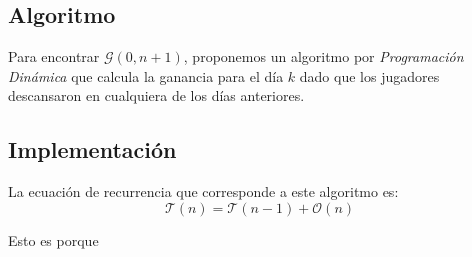 \subsection{Algoritmo}

Para encontrar $\mathcal{G} \left( 0, n + 1 \right)$, proponemos un algoritmo
por \textit{Programaci\'on Din\'amica} que calcula la ganancia para el d\'ia
$k$ dado que los jugadores descansaron en cualquiera de los d\'ias anteriores.


\subsection{Implementaci\'on}



La ecuaci\'on de recurrencia que corresponde a este algoritmo es:
\begin{equation*}
    \mathcal{T}(n) = \mathcal{T}\left(n - 1\right) + \mathcal{O}\left(n\right)
\end{equation*}

Esto es porque
